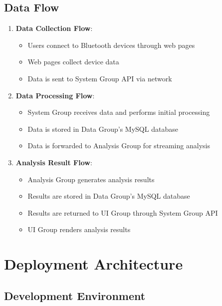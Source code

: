 \documentclass[a4paper,12pt]{article}
\begin{document}
\subsection{Data Flow}

\begin{enumerate}
  \item \textbf{Data Collection Flow}:
    \begin{itemize}
      \item Users connect to Bluetooth devices through web pages
      \item Web pages collect device data
      \item Data is sent to System Group API via network
    \end{itemize}
  
  \item \textbf{Data Processing Flow}:
    \begin{itemize}
      \item System Group receives data and performs initial processing
      \item Data is stored in Data Group's MySQL database
      \item Data is forwarded to Analysis Group for streaming analysis
    \end{itemize}
  
  \item \textbf{Analysis Result Flow}:
    \begin{itemize}
      \item Analysis Group generates analysis results
      \item Results are stored in Data Group's MySQL database
      \item Results are returned to UI Group through System Group API
      \item UI Group renders analysis results
    \end{itemize}
\end{enumerate}

\section{Deployment Architecture}

\subsection{Development Environment}
\end{document}
